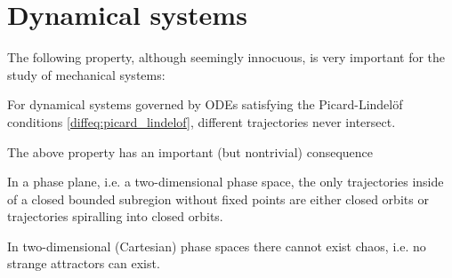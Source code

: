 \section{Dynamical systems}

    The following property, although seemingly innocuous, is very important for the study of mechanical systems:
    \begin{property}
        For dynamical systems governed by ODEs satisfying the Picard-Lindel\"of conditions \ref{diffeq:picard_lindelof}, different trajectories never intersect.
    \end{property}

    The above property has an important (but nontrivial) consequence
    \begin{theorem}
        In a phase plane, i.e. a two-dimensional phase space, the only trajectories inside of a closed bounded subregion without fixed points are either closed orbits or trajectories spiralling into closed orbits.
    \end{theorem}
    \begin{result}
        In two-dimensional (Cartesian) phase spaces there cannot exist chaos, i.e. no strange attractors can exist.
    \end{result}



